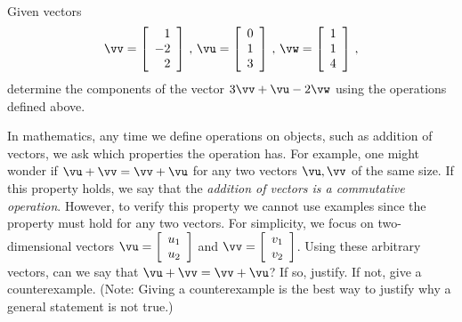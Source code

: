\begin{pa} \label{pa:1_d} ~
\be 
\item Given vectors
\[ \vv =\left[ \begin{array}{r} 1 \\ -2 \\ 2 \end{array} \right] \, , \, \vu=\left[ \begin{array}{c} 0 \\ 1\\ 3 \end{array} \right] \, , \, \vw= \left[ \begin{array}{c} 1\\ 1\\ 4 \end{array} \right]\, , \]
determine the components of the vector $3\vv + \vu - 2\vw$ using the operations defined above.



\begin{comment}
The resulting vector is $\left[ \begin{array}{r} 1 \\ -7 \\ 1 \end{array} \right] $


\end{comment}

\item In mathematics, any time we define operations on objects, such as addition of vectors, we ask which properties the operation has. For example, one might wonder if $\vu+\vv=\vv+\vu$ for any two vectors $\vu, \vv$ of the same size. If this property holds, we say that the \emph{addition of vectors is a commutative operation}. However, to verify this property we cannot use examples since the property must hold for any two vectors. For simplicity, we focus on two-dimensional vectors $\vu = \left[ \begin{array}{c} u_1\\ u_2\end{array} \right]$ and $\vv = \left[ \begin{array}{c} v_1\\ v_2\end{array} \right]$. Using these arbitrary vectors, can we say that $\vu+\vv=\vv+\vu$? If so, justify. If not, give a counterexample. (Note: Giving a counterexample is the best way to justify why a general statement is not true.)



\end{pa}
